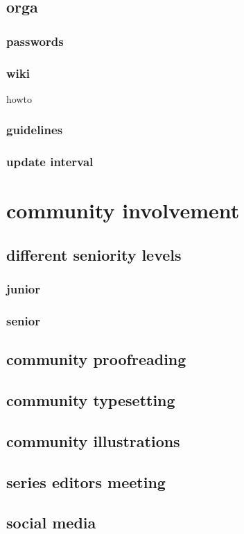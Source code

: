 \documentclass[guidelines,nonflat,modfonts] {langsci/langscibook}
\begin{document}
\subsection{orga}
\subsubsection{passwords}
\subsubsection{wiki}
                    howto
\subsubsection{guidelines}
\subsubsection{update interval}
\section{community involvement}
\subsection{different seniority levels}
\subsubsection{junior}
\subsubsection{senior}
\subsection{community proofreading}
\subsection{community typesetting}
\subsection{community illustrations}
\subsection{series editors meeting}
\subsection{social media}
\end{document}
